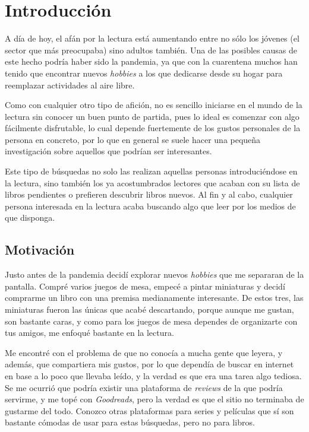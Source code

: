 \chapter{Introducción}

A día de hoy, el afán por la lectura está aumentando entre no sólo los jóvenes (el sector que más preocupaba) sino adultos también. Una de las posibles causas de este hecho podría haber sido la pandemia, ya que con la cuarentena muchos han tenido que encontrar nuevos \textit{hobbies} a los que dedicarse desde su hogar para reemplazar actividades al aire libre.

Como con cualquier otro tipo de afición, no es sencillo iniciarse en el mundo de la lectura sin conocer un buen punto de partida, pues lo ideal es comenzar con algo fácilmente disfrutable, lo cual depende fuertemente de los gustos personales de la persona en concreto, por lo que en general se suele hacer una pequeña investigación sobre aquellos que podrían ser interesantes.

Este tipo de búsquedas no solo las realizan aquellas personas introduciéndose en la lectura, sino también los ya acostumbrados lectores que acaban con su lista de libros pendientes o prefieren descubrir libros nuevos. Al fin y al cabo, cualquier persona interesada en la lectura acaba buscando algo que leer por los medios de que disponga.

\section{Motivación}

Justo antes de la pandemia decidí explorar nuevos \textit{hobbies} que me separaran de la pantalla. Compré varios juegos de mesa, empecé a pintar miniaturas y decidí comprarme un libro con una premisa medianamente interesante. De estos tres, las miniaturas fueron las únicas que acabé descartando, porque aunque me gustan, son bastante caras, y como para los juegos de mesa dependes de organizarte con tus amigos, me enfoqué bastante en la lectura.

Me encontré con el problema de que no conocía a mucha gente que leyera, y además, que compartiera mis gustos, por lo que dependía de buscar en internet en base a lo poco que llevaba leído, y la verdad es que era una tarea algo tediosa. Se me ocurrió que podría existir una plataforma de \textit{reviews} de la que podría servirme, y me topé con \textit{Goodreads}, pero la verdad es que el sitio no terminaba de gustarme del todo. Conozco otras plataformas para series y películas que sí son bastante cómodas de usar para estas búsquedas, pero no para libros.

